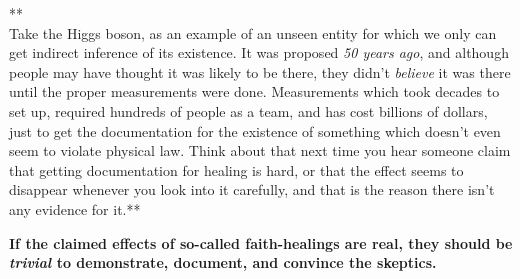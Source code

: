 **\\Take the Higgs boson, as an example of an unseen entity for which we
only can get indirect inference of its existence. It was proposed
\emph{50 years ago}, and although people may have thought it was likely
to be there, they didn't \emph{believe} it was there until the proper
measurements were done. Measurements which took decades to set up,
required hundreds of people as a team, and has cost billions of dollars,
just to get the documentation for the existence of something which
doesn't even seem to violate physical law. Think about that next time
you hear someone claim that getting documentation for healing is hard,
or that the effect seems to disappear whenever you look into it
carefully, and that is the reason there isn't any evidence for it.**

\textbf{If the claimed effects of so-called faith-healings are real,
they should be \emph{trivial} to demonstrate, document, and convince the
skeptics.}
